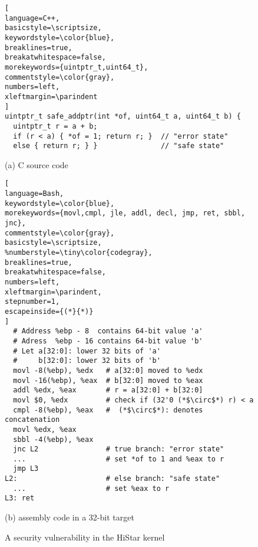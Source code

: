 \begin{figure}
\begin{lstlisting}[
language=C++,
basicstyle=\scriptsize,
keywordstyle=\color{blue},
breaklines=true,
breakatwhitespace=false,
morekeywords={uintptr_t,uint64_t},
commentstyle=\color{gray},
numbers=left,
xleftmargin=\parindent
]
uintptr_t safe_addptr(int *of, uint64_t a, uint64_t b) {
  uintptr_t r = a + b;
  if (r < a) { *of = 1; return r; }  // "error state" 
  else { return r; } }               // "safe state" 
\end{lstlisting}
\vspace{-5pt}
\begin{center}
{\small (a) C source code}
\end{center}
\begin{lstlisting}[
language=Bash,
keywordstyle=\color{blue},
morekeywords={movl,cmpl, jle, addl, decl, jmp, ret, sbbl, jnc},
commentstyle=\color{gray},
basicstyle=\scriptsize,
%numberstyle=\tiny\color{codegray},
breaklines=true,
breakatwhitespace=false,
numbers=left,
xleftmargin=\parindent,
stepnumber=1,
escapeinside={(*}{*)}
]
  # Address %ebp - 8  contains 64-bit value 'a'  
  # Adress  %ebp - 16 contains 64-bit value 'b'
  # Let a[32:0]: lower 32 bits of 'a' 
  #     b[32:0]: lower 32 bits of 'b'
  movl -8(%ebp), %edx   # a[32:0] moved to %edx
  movl -16(%ebp), %eax  # b[32:0] moved to %eax
  addl %edx, %eax       # r = a[32:0] + b[32:0]
  movl $0, %edx         # check if (32'0 (*$\circ$*) r) < a
  cmpl -8(%ebp), %eax   #  (*$\circ$*): denotes concatenation
  movl %edx, %eax
  sbbl -4(%ebp), %eax
  jnc L2                # true branch: "error state"
  ...                   # set *of to 1 and %eax to r
  jmp L3
L2:                     # else branch: "safe state"
  ...                   # set %eax to r
L3: ret
\end{lstlisting}
\vspace{-5pt}
\begin{center}
{\small (b) \ISA assembly code in a 32-bit target}
\end{center}
\vspace*{-5pt}
\caption{A security vulnerability in the HiStar kernel}
\label{fig:histar}
\end{figure}

